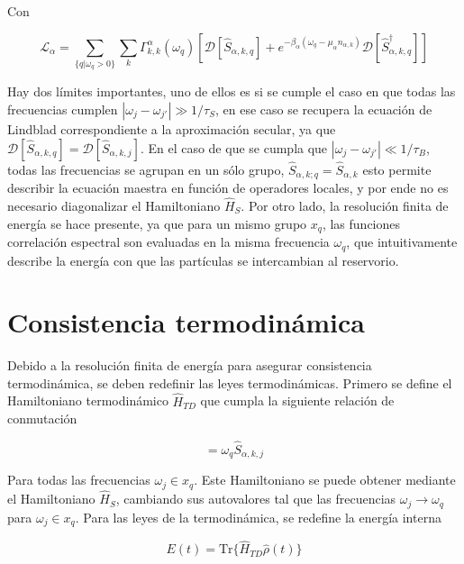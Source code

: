 Con

\begin{equation}
    \mathcal{L}_{\alpha} = \sum_{\{q|\omega_{q}>0\}} \sum_{k}\Gamma^{\alpha}_{k,k}(\omega_{q}) \left[ \mathcal{D}[\hat{S}_{\alpha,k,q}] + e^{-\beta_{\alpha}(\omega_{q} - \mu_{\alpha}n_{\alpha,k})}\mathcal{D}[\hat{S}^{\dagger}_{\alpha,k,q}]  \right]
\label{sec2lindbladconsistency}
\end{equation}

Hay dos límites importantes, uno de ellos es si se cumple el caso en que todas las frecuencias cumplen $|\omega_{j}-\omega_{j'}| \gg 1/\tau_{S}$, en ese caso se recupera la ecuación de Lindblad correspondiente a la aproximación secular, ya que $\mathcal{D}[\hat{S}_{\alpha,k,q}] = \mathcal{D}[\hat{S}_{\alpha,k,j}]$. En el caso de que se cumpla que $|\omega_{j}-\omega_{j'}| \ll 1/\tau_{B}$, todas las frecuencias se agrupan en un sólo grupo, $\hat{S}_{\alpha,k;q} = \hat{S}_{\alpha,k}$ esto permite describir la ecuación maestra en función de operadores locales, y por ende no es necesario diagonalizar el Hamiltoniano $\hat{H}_{S}$\cite{wichterich2007modeling}. Por otro lado, la resolución finita de energía se hace presente, ya  que para un mismo grupo $x_{q}$, las funciones correlación espectral son evaluadas en la misma frecuencia $\omega_{q}$, que intuitivamente describe la energía con que las partículas se intercambian al reservorio.  

\section{Consistencia termodinámica}
Debido a la resolución finita de energía para asegurar consistencia termodinámica, se deben redefinir las leyes termodinámicas. Primero se define el Hamiltoniano termodinámico $\hat{H}_{TD}$ que cumpla la siguiente relación de conmutación

\begin{equation*}
    [\hat{S}_{\alpha,k,j},\hat{H}_{TD}] = \omega_{q}\hat{S}_{\alpha,k,j}
\end{equation*}

Para todas las frecuencias $\omega_{j} \in x_{q}$. Este Hamiltoniano se puede obtener mediante el Hamiltoniano $\hat{H}_{S}$, cambiando sus autovalores tal que las frecuencias $\omega_{j} \to \omega_{q}$ para $\omega_{j} \in x_{q}$. Para las leyes de la termodinámica, se redefine la energía interna

\begin{equation*}
    E(t) = \text{Tr}\{\hat{H}_{TD}\hat{\rho}(t) \}
\end{equation*}

